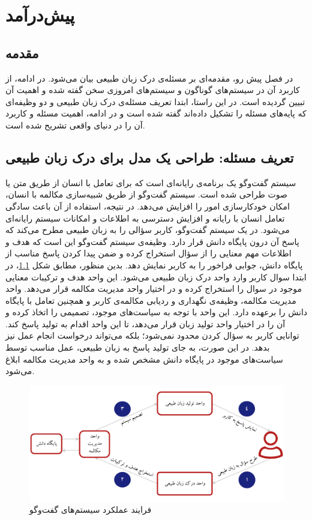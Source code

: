\chapter{پیش‌درآمد}
\pagebreak
\section{مقدمه}
در فصل پیش رو، مقدمه‌ای بر مسئله‌ی درک زبان طبیعی بیان می‌شود. در ادامه، از کاربرد آن در سیستم‌های گوناگون و سیستم‌های امروزی سخن گفته شده و اهمیت آن تبیین گردیده است. در این راستا،  ابتدا تعریف مسئله‌ی درک زبان طبیعی و دو وظیفه‌ای که پایه‌های مسئله را تشکیل داده‌اند گفته شده است و در ادامه، اهمیت مسئله و کاربرد آن را در دنیای واقعی تشریح شده است.
\section{تعریف مسئله: طراحی یک مدل برای درک زبان طبیعی}
سیستم گفت‌وگو
 یک برنامه‌ی رایانه‌ای است که برای تعامل با انسان از طریق متن یا صوت طراحی شده است. سیستم گفت‌وگو از طریق شبیه‌سازی مکالمه با انسان، امکان خودکارسازی امور را افزایش می‌دهد. در نتیجه، استفاده از آن باعث سادگی تعامل انسان با رایانه و افزایش دسترسی به اطلاعات و امکانات سیستم رایانه‌ای می‌شود.
در یک سیستم گفت‌وگو، کاربر سؤالی را به زبان طبیعی مطرح می‌کند که پاسخ آن درون پایگاه دانش قرار دارد. وظیفه‌ی سیستم گفت‌وگو این است که هدف و اطلاعات مهم معنایی را از سؤال استخراج کرده و ضمن پیدا کردن پاسخ مناسب از پایگاه دانش، جوابی فراخور را به کاربر نمایش دهد. بدین منظور، مطابق شکل \ref{Fig:dialoguesystem}، در ابتدا سوال کاربر وارد واحد درک زبان طبیعی می‌شود. این واحد هدف و ترکیبات معنایی موجود در سوال را استخراج کرده و در اختیار واحد مدیریت مکالمه قرار می‌دهد. واحد مدیریت مکالمه، وظیفه‌ی نگهداری و ردیابی مکالمه‌ی کاربر و همچنین تعامل با پایگاه دانش را برعهده دارد.  این واحد با توجه به سیاست‌‌های موجود، تصمیمی را اتخاذ کرده و آن را در اختیار واحد تولید زبان قرار می‌دهد، تا این واحد اقدام به تولید پاسخ کند. توانایی کاربر به سؤال کردن محدود نمی‌شود؛ بلکه می‌تواند درخواست انجام عمل نیز بدهد. در این صورت، به جای تولید پاسخ به زبان طبیعی، عمل مناسب توسط سیاست‌های موجود در پایگاه دانش مشخص شده و به واحد مدیریت مکالمه ابلاغ می‌شود.
\begin{figure}[!htb]
	\centering
	\includegraphics[scale=0.9]{Figures/dialoguesystem.pdf}
	\caption{فرایند عملکرد سیستم‌های گفت‌وگو}
	\label{Fig:dialoguesystem}
\end{figure} 



